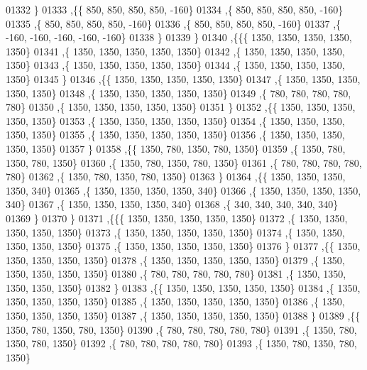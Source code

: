 \begin{DoxyCode}
01332    \}
01333   ,\{\{   850,   850,   850,   850,  -160\}
01334    ,\{   850,   850,   850,   850,  -160\}
01335    ,\{   850,   850,   850,   850,  -160\}
01336    ,\{   850,   850,   850,   850,  -160\}
01337    ,\{  -160,  -160,  -160,  -160,  -160\}
01338    \}
01339   \}
01340  ,\{\{\{  1350,  1350,  1350,  1350,  1350\}
01341    ,\{  1350,  1350,  1350,  1350,  1350\}
01342    ,\{  1350,  1350,  1350,  1350,  1350\}
01343    ,\{  1350,  1350,  1350,  1350,  1350\}
01344    ,\{  1350,  1350,  1350,  1350,  1350\}
01345    \}
01346   ,\{\{  1350,  1350,  1350,  1350,  1350\}
01347    ,\{  1350,  1350,  1350,  1350,  1350\}
01348    ,\{  1350,  1350,  1350,  1350,  1350\}
01349    ,\{   780,   780,   780,   780,   780\}
01350    ,\{  1350,  1350,  1350,  1350,  1350\}
01351    \}
01352   ,\{\{  1350,  1350,  1350,  1350,  1350\}
01353    ,\{  1350,  1350,  1350,  1350,  1350\}
01354    ,\{  1350,  1350,  1350,  1350,  1350\}
01355    ,\{  1350,  1350,  1350,  1350,  1350\}
01356    ,\{  1350,  1350,  1350,  1350,  1350\}
01357    \}
01358   ,\{\{  1350,   780,  1350,   780,  1350\}
01359    ,\{  1350,   780,  1350,   780,  1350\}
01360    ,\{  1350,   780,  1350,   780,  1350\}
01361    ,\{   780,   780,   780,   780,   780\}
01362    ,\{  1350,   780,  1350,   780,  1350\}
01363    \}
01364   ,\{\{  1350,  1350,  1350,  1350,   340\}
01365    ,\{  1350,  1350,  1350,  1350,   340\}
01366    ,\{  1350,  1350,  1350,  1350,   340\}
01367    ,\{  1350,  1350,  1350,  1350,   340\}
01368    ,\{   340,   340,   340,   340,   340\}
01369    \}
01370   \}
01371  ,\{\{\{  1350,  1350,  1350,  1350,  1350\}
01372    ,\{  1350,  1350,  1350,  1350,  1350\}
01373    ,\{  1350,  1350,  1350,  1350,  1350\}
01374    ,\{  1350,  1350,  1350,  1350,  1350\}
01375    ,\{  1350,  1350,  1350,  1350,  1350\}
01376    \}
01377   ,\{\{  1350,  1350,  1350,  1350,  1350\}
01378    ,\{  1350,  1350,  1350,  1350,  1350\}
01379    ,\{  1350,  1350,  1350,  1350,  1350\}
01380    ,\{   780,   780,   780,   780,   780\}
01381    ,\{  1350,  1350,  1350,  1350,  1350\}
01382    \}
01383   ,\{\{  1350,  1350,  1350,  1350,  1350\}
01384    ,\{  1350,  1350,  1350,  1350,  1350\}
01385    ,\{  1350,  1350,  1350,  1350,  1350\}
01386    ,\{  1350,  1350,  1350,  1350,  1350\}
01387    ,\{  1350,  1350,  1350,  1350,  1350\}
01388    \}
01389   ,\{\{  1350,   780,  1350,   780,  1350\}
01390    ,\{   780,   780,   780,   780,   780\}
01391    ,\{  1350,   780,  1350,   780,  1350\}
01392    ,\{   780,   780,   780,   780,   780\}
01393    ,\{  1350,   780,  1350,   780,  1350\}

\end{DoxyCode}

